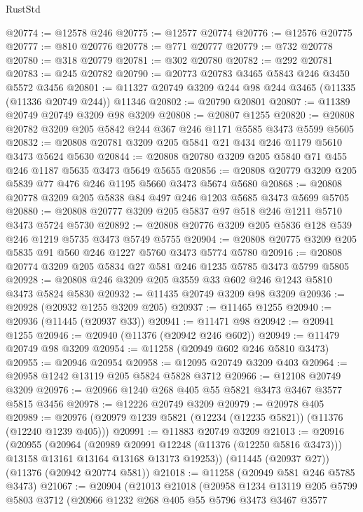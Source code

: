 \begin{lexlean}{RustStd}
\begin{coremodule}
{\begin{coremodule}
{{{{{{{{{{{{{{{{{{{{{{{{{{{{{{{{{{{{{{{{{{{{{{{{{{{{{{{{{{{{{{{{{{{{{{{{{{{{{{{{{{{{{@20774 := @12578 @246
@20775 := @12577 @20774
@20776 := @12576 @20775
@20777 := @810 @20776
@20778 := @771 @20777
@20779 := @732 @20778
@20780 := @318 @20779
@20781 := @302 @20780
@20782 := @292 @20781
@20783 := @245 @20782
@20790 := @20773 @20783 @3465 @5843 @246 @3450 @5572 @3456
@20801 := @11327 @20749 @3209 @244 @98 @244 @3465 (@11335 (@11336 @20749 @244)) @11346
@20802 := @20790 @20801
@20807 := @11389 @20749 @20749 @3209 @98 @3209
@20808 := @20807 @1255
@20820 := @20808 @20782 @3209 @205 @5842 @244 @367 @246 @1171 @5585 @3473 @5599 @5605
@20832 := @20808 @20781 @3209 @205 @5841 @21 @434 @246 @1179 @5610 @3473 @5624 @5630
@20844 := @20808 @20780 @3209 @205 @5840 @71 @455 @246 @1187 @5635 @3473 @5649 @5655
@20856 := @20808 @20779 @3209 @205 @5839 @77 @476 @246 @1195 @5660 @3473 @5674 @5680
@20868 := @20808 @20778 @3209 @205 @5838 @84 @497 @246 @1203 @5685 @3473 @5699 @5705
@20880 := @20808 @20777 @3209 @205 @5837 @97 @518 @246 @1211 @5710 @3473 @5724 @5730
@20892 := @20808 @20776 @3209 @205 @5836 @128 @539 @246 @1219 @5735 @3473 @5749 @5755
@20904 := @20808 @20775 @3209 @205 @5835 @91 @560 @246 @1227 @5760 @3473 @5774 @5780
@20916 := @20808 @20774 @3209 @205 @5834 @27 @581 @246 @1235 @5785 @3473 @5799 @5805
@20928 := @20808 @246 @3209 @205 @3559 @33 @602 @246 @1243 @5810 @3473 @5824 @5830
@20932 := @11435 @20749 @3209 @98 @3209
@20936 := @20928 (@20932 @1255 @3209 @205)
@20937 := @11465 @1255
@20940 := @20936 (@11445 (@20937 @33))
@20941 := @11471 @98
@20942 := @20941 @1255
@20946 := @20940 (@11376 (@20942 @246 @602))
@20949 := @11479 @20749 @98 @3209
@20954 := @11258 (@20949 @602 @246 @5810 @3473)
@20955 := @20946 @20954
@20958 := @12095 @20749 @3209 @403
@20964 := @20958 @1242 @13119 @205 @5824 @5828 @3712
@20966 := @12108 @20749 @3209
@20976 := @20966 @1240 @268 @405 @55 @5821 @3473 @3467 @3577 @5815 @3456
@20978 := @12226 @20749 @3209
@20979 := @20978 @405
@20989 := @20976 (@20979 @1239 @5821 (@12234 (@12235 @5821)) (@11376 (@12240 @1239 @405)))
@20991 := @11883 @20749 @3209
@21013 := @20916
    (@20955
      (@20964
        (@20989 @20991 @12248 (@11376 (@12250 @5816 @3473)))
        @13158
        @13161
        @13164
        @13168
        @13173
        @19253))
    (@11445 (@20937 @27))
    (@11376 (@20942 @20774 @581))
@21018 := @11258 (@20949 @581 @246 @5785 @3473)
@21067 := @20904
    (@21013
      @21018
      (@20958
        @1234
        @13119
        @205
        @5799
        @5803
        @3712
        (@20966
          @1232
          @268
          @405
          @55
          @5796
          @3473
          @3467
          @3577
}}}}}}}}}}}}}}}}}}}}}}}}}}}}}}}}}}}}}}}}}}}}}}}}}}}}}}}}}}}}}}}}}}}}}}}}}}}}}}}}}}}}}
\end{coremodule}}
\end{coremodule}
\end{lexlean}
